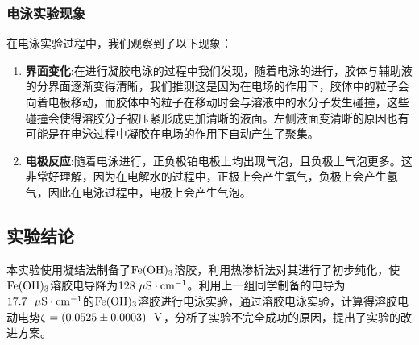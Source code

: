 \documentclass[12pt]{article}
\begin{document}
		\subsubsection{电泳实验现象}
		在电泳实验过程中，我们观察到了以下现象：\par
		\begin{enumerate}
			\item \textbf{界面变化}:在进行凝胶电泳的过程中我们发现，随着电泳的进行，胶体与辅助液的分界面逐渐变得清晰，我们推测这是因为在电场的作用下，胶体中的粒子会向着电极移动，而胶体中的粒子在移动时会与溶液中的水分子发生碰撞，这些碰撞会使得溶胶分子被压紧形成更加清晰的液面。左侧液面变清晰的原因也有可能是在电泳过程中凝胶在电场的作用下自动产生了聚集。\par
			\item \textbf{电极反应}:随着电泳进行，正负极铂电极上均出现气泡，且负极上气泡更多。这非常好理解，因为在电解水的过程中，正极上会产生氧气，负极上会产生氢气，因此在电泳过程中，电极上会产生气泡。\par
		\end{enumerate}	
 		\subsection{实验结论}
		 本实验使用凝结法制备了$\rm Fe(OH)_{3}$溶胶，利用热渗析法对其进行了初步纯化，使$\rm Fe(OH)_{3}$溶胶电导降为$128\  {\rm \mu S\cdot cm^{-1}}$。利用上一组同学制备的电导为$17.7\ \ {\rm \mu S\cdot cm^{-1}}$的$\rm Fe(OH)_{3}$溶胶进行电泳实验，通过溶胶电泳实验，计算得溶胶电动电势$\zeta=(0.0525\pm 0.0003)\ \ {\rm V}$，分析了实验不完全成功的原因，提出了实验的改进方案。

\vbox{}  


\end{document}

